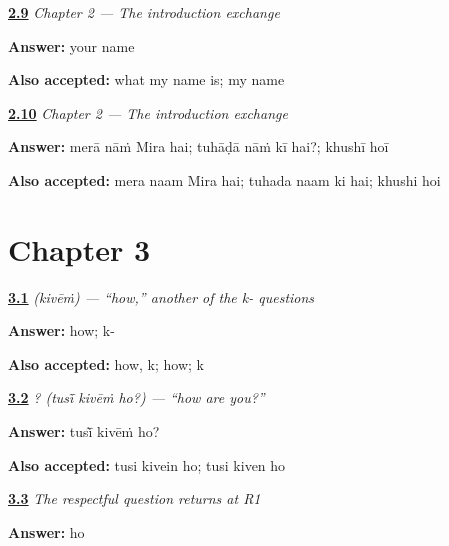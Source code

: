 \noindent\begin{minipage}[t]{\linewidth}
\raggedright
\hyperlink{review-PA-C02-practice-listening}{\textbf{2.9}} \emph{Chapter 2 — The introduction exchange}\par
\small \textbf{Answer:} your name\par
\footnotesize \textbf{Also accepted:} what my name is; my name
\end{minipage}\par\medskip

\noindent\begin{minipage}[t]{\linewidth}
\raggedright
\hyperlink{review-PA-C02-practice-speaking}{\textbf{2.10}} \emph{Chapter 2 — The introduction exchange}\par
\small \textbf{Answer:} merā nāṁ Mira hai; tuhāḍā nāṁ kī hai?; khushī hoī\par
\footnotesize \textbf{Also accepted:} mera naam Mira hai; tuhada naam ki hai; khushi hoi
\end{minipage}\par\medskip

\section*{Chapter 3}

\noindent\begin{minipage}[t]{\linewidth}
\raggedright
\hyperlink{review-PA-C03-kivein-meaning}{\textbf{3.1}} \emph{ (kivēṁ) — \textquotedblleft{}how,\textquotedblright{} another of the k- questions}\par
\small \textbf{Answer:} how; k-\par
\footnotesize \textbf{Also accepted:} how, k; how; k
\end{minipage}\par\medskip

\noindent\begin{minipage}[t]{\linewidth}
\raggedright
\hyperlink{review-PA-C03-tusi-kivein-ho-speaking}{\textbf{3.2}} \emph{  ? (tusī̃ kivēṁ ho?) — \textquotedblleft{}how are you?\textquotedblright{}}\par
\small \textbf{Answer:} tusī̃ kivēṁ ho?\par
\footnotesize \textbf{Also accepted:} tusi kivein ho; tusi kiven ho
\end{minipage}\par\medskip

\noindent\begin{minipage}[t]{\linewidth}
\raggedright
\hyperlink{review-PA-R03-wellbeing-r1-ho}{\textbf{3.3}} \emph{The respectful question returns at R1}\par
\small \textbf{Answer:} ho\par
\end{minipage}\par\medskip

